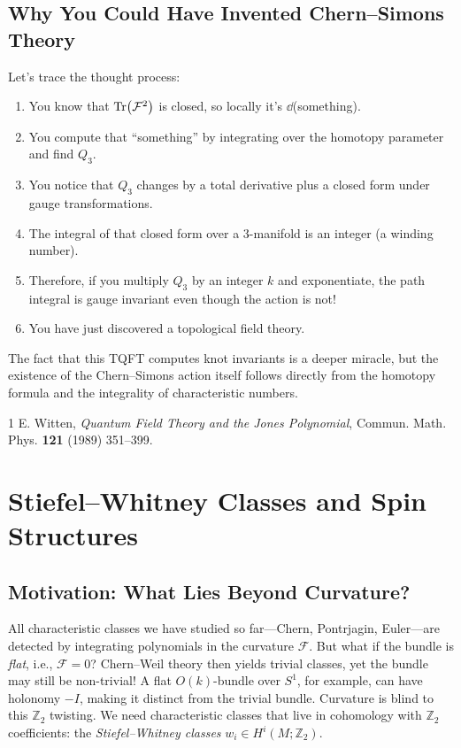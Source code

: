 \documentclass[11pt]{article}
\newcommand{\cF}{\mathcal{F}}
\newcommand{\Z}{\mathbb{Z}}
\begin{document}
\subsection{Why You Could Have Invented Chern--Simons Theory}
Let's trace the thought process:
\begin{enumerate}
    \item You know that \(\Tr(\cF^2)\) is closed, so locally it's \(\dd\)(something).
    \item You compute that ``something'' by integrating over the homotopy parameter and find \(Q_3\).
    \item You notice that \(Q_3\) changes by a total derivative plus a closed form under gauge transformations.
    \item The integral of that closed form over a 3-manifold is an integer (a winding number).
    \item Therefore, if you multiply \(Q_3\) by an integer \(k\) and exponentiate, the path integral is gauge invariant even though the action is not!
    \item You have just discovered a topological field theory.
\end{enumerate}
The fact that this TQFT computes knot invariants is a deeper miracle, but the existence of the Chern--Simons action itself follows directly from the homotopy formula and the integrality of characteristic numbers.

\begin{thebibliography}{1}
 E. Witten, \textit{Quantum Field Theory and the Jones Polynomial}, Commun. Math. Phys. \textbf{121} (1989) 351--399.
\end{thebibliography}
\section{Stiefel--Whitney Classes and Spin Structures}
\label{sec:sw}

\subsection{Motivation: What Lies Beyond Curvature?}
All characteristic classes we have studied so far---Chern, Pontrjagin, Euler---are detected by integrating polynomials in the curvature \(\cF\). But what if the bundle is \emph{flat}, i.e., \(\cF = 0\)? Chern--Weil theory then yields trivial classes, yet the bundle may still be non-trivial! A flat \(O(k)\)-bundle over \(S^1\), for example, can have holonomy \(-I\), making it distinct from the trivial bundle. Curvature is blind to this \(\Z_2\) twisting. We need characteristic classes that live in cohomology with \(\Z_2\) coefficients: the \emph{Stiefel--Whitney classes} \(w_i \in H^i(M;\Z_2)\).
\end{document}
